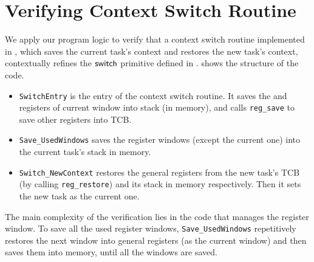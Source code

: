 \section{Verifying Context Switch Routine}
\label{sec:ctxswitch}

\indent
We apply our program logic to verify
that a context switch routine implemented in \sparc,
which saves the current task's context and
restores the new task's context,
contextually refines the $\mathsf{switch}{}$ primitive
defined in \Sec{\ref{subsec:High-level Pseudo-SPARCv8 Language}}.
\Fig{\ref{fig:The Structure of Context Switch Routine}}
shows the structure of the code.
\begin{center}
    
	\label{fig:The Structure of Context Switch Routine}
\end{center}
\begin{itemize}
    \item \texttt{SwitchEntry}
    is the entry of the context switch routine.
    It saves the \localRN{} and \inRN{} registers of current
    window into stack (in memory), and calls
    \texttt{reg\_save} to save other registers into TCB.

    \item
    \texttt{Save\_UsedWindows} saves
	the register windows (except the current one)
    into the current task's stack in memory.

    \item
    \texttt{Switch\_NewContext}
    restores the general registers from the new task's TCB
    (by calling \texttt{reg\_restore})
    and its stack in memory
    respectively. Then it sets the new task as
    the current one.
\end{itemize}

The main complexity of the verification lies in
the code that manages the register window.
To save all the used
register windows, \texttt{Save\_UsedWindows}
repetitively restores the next window into general registers
(as the current window)
and then saves them into memory, until all the windows are saved.

